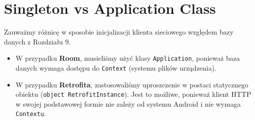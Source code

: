 \section{Singleton vs Application Class}

Zauważmy różnicę w sposobie inicjalizacji klienta sieciowego względem bazy danych z Rozdziału 9.
\begin{itemize}
    \item W przypadku \textbf{Room}, musieliśmy użyć klasy \texttt{Application}, ponieważ baza danych wymaga dostępu do \texttt{Context} (systemu plików urządzenia).
    \item W przypadku \textbf{Retrofita}, zastosowaliśmy uproszczenie w postaci statycznego obiektu (\texttt{object RetrofitInstance}). Jest to możliwe, ponieważ klient HTTP w swojej podstawowej formie nie zależy od systemu Android i nie wymaga \texttt{Contextu}.
\end{itemize}